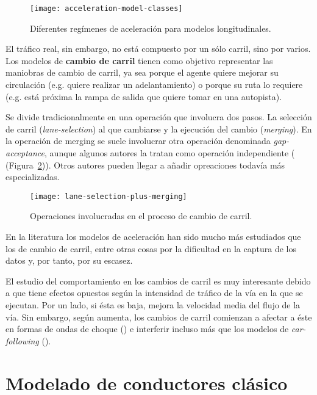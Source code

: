 \begin{figure}
	\centering
	\texttt{[image: acceleration-model-classes]}
	\caption[Diferentes regímenes de aceleración para modelos longitudinales]{Diferentes regímenes de aceleración para modelos longitudinales.}
	\label{fig:acceleration-model-classes}
\end{figure}

El tráfico real, sin embargo, no está compuesto por un sólo carril, sino por varios. Los modelos de \textbf{cambio de carril} tienen como objetivo representar las maniobras de cambio de carril, ya sea porque el agente quiere mejorar su circulación (e.g. quiere realizar un adelantamiento) o porque su ruta lo requiere (e.g. está próxima la rampa de salida que quiere tomar en una autopista).

Se divide tradicionalmente en una operación que involucra dos pasos. La selección de carril (\textit{lane-selection}) al que cambiarse y la ejecución del cambio (\textit{merging}). En la operación de merging se suele involucrar otra operación denominada \textit{gap-acceptance}, aunque algunos autores la tratan como operación independiente ( (Figura~\ref{fig:lane-selection-plus-merging})). Otros autores pueden llegar a añadir opreaciones todavía más especializadas.

\begin{figure}
	\centering
	\texttt{[image: lane-selection-plus-merging]}
	\caption[Operaciones involucradas en el proceso de cambio de carril]{Operaciones involucradas en el proceso de cambio de carril.}
	\label{fig:lane-selection-plus-merging}
\end{figure}

En la literatura los modelos de aceleración han sido mucho más estudiados que los de cambio de carril, entre otras cosas por la dificultad en la captura de los datos y, por tanto, por su escasez.

El estudio del comportamiento en los cambios de carril es muy interesante debido a que tiene efectos opuestos según la intensidad de tráfico de la vía en la que se ejecutan. Por un lado, si ésta es baja, mejora la velocidad media del flujo de la vía. Sin embargo, según aumenta, los cambios de carril comienzan a afectar a éste en formas de ondas de choque (\cite{Sasoh2002, Jin2006}) e interferir incluso más que los modelos de \textit{\gls{car-following}} (\cite{Laval2006}).

\section{Modelado de conductores clásico}

